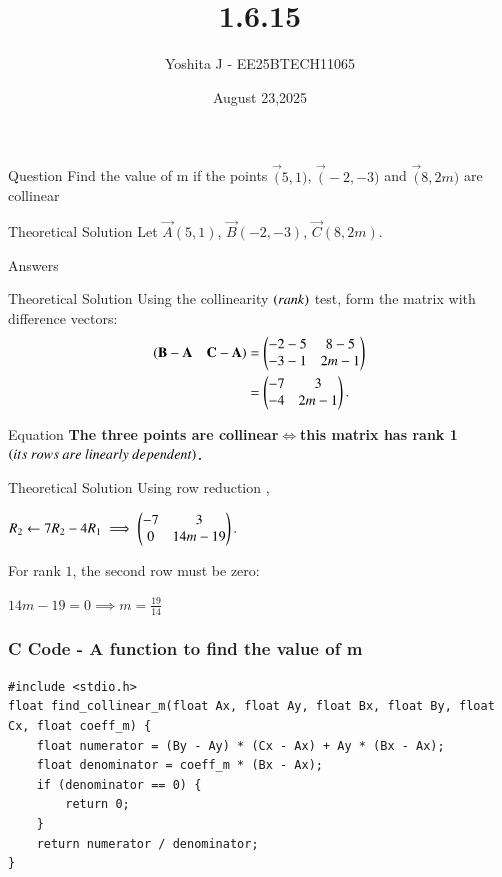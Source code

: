 \documentclass{beamer}
\begin{document}
\title 
{1.6.15}
\date{August 23,2025}


\author 
{Yoshita J - EE25BTECH11065}






\frame{\titlepage}
\begin{frame}{Question}
 Find the value of m if the points $\vec(5,1)$, $\vec(-2,-3)$ and $\vec(8,2m)$ are collinear
\end{frame}



\begin{frame}{Theoretical Solution}
Let $\vec{A}(5,1)$, $\vec{B}(-2,-3)$, $\vec{C}(8,2m)$.
\\
\begin{table}[H]    
  \centering
  
  \caption{Answers}
  \label{Answers}
\end{table}
\end{frame}
\begin{frame}{Theoretical Solution}
Using the collinearity $\left(rank\right)$ test, form the matrix with difference vectors:
\begin{align*}
    (\mathbf{B}-\mathbf{A} \quad \mathbf{C}-\mathbf{A}) &= \begin{pmatrix}-2-5 & 8-5 \\ -3-1 & 2m-1\end{pmatrix} \\
    &= \begin{pmatrix}-7 & 3 \\ -4 & 2m-1\end{pmatrix}.
\end{align*}
\end{frame}

\begin{frame}{Equation}
\textbf{The three points are collinear$\iff$this matrix has rank 1 $\brak{its\ rows\ are\ linearly\ dependent}$.\\}
\end{frame}
\begin{frame}{Theoretical Solution}
Using row reduction ,
\begin{center}
 $R_2 \leftarrow 7R_2 - 4R_1 \implies \begin{pmatrix} -7 & 3 \\ 0 & 14m-19 \end{pmatrix}.$
 \end{center}

For rank $1$, the second row must be zero:
\begin{center}
$14m - 19 = 0 \implies m = \frac{19}{14}$
\end{center}
\end{frame}


\begin{frame}[fragile]
    \frametitle{C Code - A function to find the value of m}

    \begin{lstlisting}
#include <stdio.h>
float find_collinear_m(float Ax, float Ay, float Bx, float By, float Cx, float coeff_m) {
    float numerator = (By - Ay) * (Cx - Ax) + Ay * (Bx - Ax);
    float denominator = coeff_m * (Bx - Ax);
    if (denominator == 0) {  
        return 0; 
    }
    return numerator / denominator;
}

    \end{lstlisting}
\end{frame}
\end{document}
